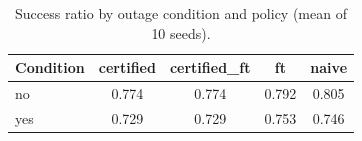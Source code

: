 \begin{table}[t]
\centering
\small
\caption{Success ratio by outage condition and policy (mean of 10 seeds).}
\label{tab:p3-outage}
\begin{tabular}{lcccc}
\toprule
Condition & certified & certified\_ft & ft & naive \\
\midrule
no & 0.774 & 0.774 & 0.792 & 0.805 \\
yes & 0.729 & 0.729 & 0.753 & 0.746 \\
\bottomrule
\end{tabular}
\par\vspace{2pt}{\footnotesize\raggedright Outage takes the primary edge site down for 90 s at t = 120 s.\par}
\end{table}
